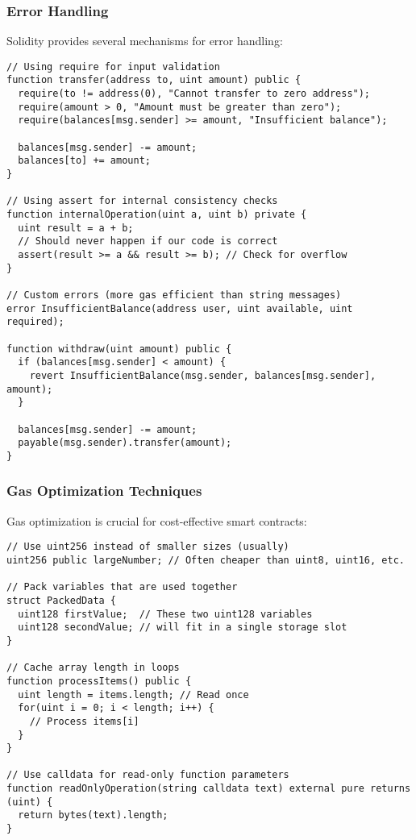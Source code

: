 \documentclass[12pt]{article}
\begin{document}
\noindent
\begin{minipage}[c]{\textwidth}
\subsubsection*{Error Handling}
Solidity provides several mechanisms for error handling:

\begin{lstlisting}[language=Solidity]
// Using require for input validation
function transfer(address to, uint amount) public {
  require(to != address(0), "Cannot transfer to zero address");
  require(amount > 0, "Amount must be greater than zero");
  require(balances[msg.sender] >= amount, "Insufficient balance");
  
  balances[msg.sender] -= amount;
  balances[to] += amount;
}

// Using assert for internal consistency checks
function internalOperation(uint a, uint b) private {
  uint result = a + b;
  // Should never happen if our code is correct
  assert(result >= a && result >= b); // Check for overflow
}

// Custom errors (more gas efficient than string messages)
error InsufficientBalance(address user, uint available, uint required);

function withdraw(uint amount) public {
  if (balances[msg.sender] < amount) {
    revert InsufficientBalance(msg.sender, balances[msg.sender], amount);
  }
  
  balances[msg.sender] -= amount;
  payable(msg.sender).transfer(amount);
}
\end{lstlisting}
\end{minipage}

\subsubsection*{Gas Optimization Techniques}
Gas optimization is crucial for cost-effective smart contracts:

\noindent
\begin{minipage}[c]{\textwidth}
\begin{lstlisting}[language=Solidity]
// Use uint256 instead of smaller sizes (usually)
uint256 public largeNumber; // Often cheaper than uint8, uint16, etc.

// Pack variables that are used together
struct PackedData {
  uint128 firstValue;  // These two uint128 variables
  uint128 secondValue; // will fit in a single storage slot
}

// Cache array length in loops
function processItems() public {
  uint length = items.length; // Read once
  for(uint i = 0; i < length; i++) {
    // Process items[i]
  }
}

// Use calldata for read-only function parameters
function readOnlyOperation(string calldata text) external pure returns (uint) {
  return bytes(text).length;
}
\end{lstlisting}
\end{minipage}
\end{document}
